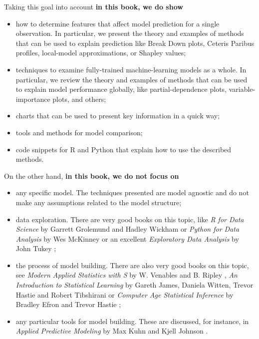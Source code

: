 \documentclass[]{krantz}
\providecommand{\tightlist}{%
  \setlength{\itemsep}{0pt}\setlength{\parskip}{0pt}}
\begin{document}
Taking this goal into account \textbf{in this book, we do show}

\begin{itemize}
\tightlist
\item
  how to determine features that affect model prediction for a single observation. In particular, we present the theory and examples of methods that can be used to explain prediction like Break Down plots, Ceteris Paribus profiles, local-model approximations, or Shapley values;
\item
  techniques to examine fully-trained machine-learning models as a whole. In particular, we review the theory and examples of methods that can be used to explain model performance globally, like partial-dependence plots, variable-importance plots, and others;
\item
  charts that can be used to present key information in a quick way;
\item
  tools and methods for model comparison;
\item
  code snippets for R and Python that explain how to use the described methods.
\end{itemize}

On the other hand, \textbf{in this book, we do not focus on}

\begin{itemize}
\tightlist
\item
  any specific model. The techniques presented are model agnostic and do not make any assumptions related to the model structure;
\item
  data exploration. There are very good books on this topic, like \emph{R for Data Science} by Garrett Grolemund and Hadley Wickham \citep{r4ds2019} or \emph{Python for Data Analysis} \citep{Wes2012} by Wes McKinney or an excellent \emph{Exploratory Data Analysis} by John Tukey \citep{tukey1977};
\item
  the process of model building. There are also very good books on this topic, see \emph{Modern Applied Statistics with S} by W. Venables and B. Ripley \citep{MASSbook}, \emph{An Introduction to Statistical Learning} by Gareth James, Daniela Witten, Trevor Hastie and Robert Tibshirani \citep{James20147} or \emph{Computer Age Statistical Inference} by Bradley Efron and Trevor Hastie \citep{Efron2016};
\item
  any particular tools for model building. These are discussed, for instance, in \emph{Applied Predictive Modeling} by Max Kuhn and Kjell Johnson \citep{Kuhn2013}.
\end{itemize}
\end{document}
